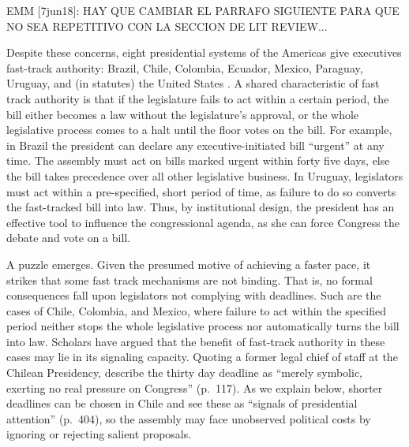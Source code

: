 \documentclass[letter,12pt]{article}
\begin{document}
EMM [7jun18]: HAY QUE CAMBIAR EL PARRAFO SIGUIENTE PARA QUE NO SEA REPETITIVO CON LA SECCION DE LIT REVIEW...

Despite these concerns, eight presidential systems of the Americas give executives fast-track authority: Brazil, Chile, Colombia, Ecuador, Mexico, Paraguay, Uruguay, and (in statutes) the United States \citep{morgenstern.2002b,garcia.montero.presidentes.2009}. A shared characteristic of fast track authority is that if the legislature fails to act within a certain period, the bill either becomes a law without the legislature's approval, or the whole legislative process comes to a halt until the floor votes on the bill. For example, in Brazil the president can declare any executive-initiated bill ``urgent'' at any time. The assembly must act on bills marked urgent within forty five days, else the bill takes precedence over all other legislative business. In Uruguay, legislators must act within a pre-specified, short period of time, as failure to do so converts the fast-tracked bill into law. Thus, by institutional design, the president has an effective tool to influence the congressional agenda, as she can force Congress the debate and vote on a bill.

A puzzle emerges. Given the presumed motive of achieving a faster pace, it strikes that some fast track mechanisms are not binding. That is, no formal consequences fall upon legislators not complying with deadlines. Such are the cases of Chile, Colombia, and Mexico, where failure to act within the specified period neither stops the whole legislative process nor automatically turns the bill into law. Scholars have argued that the benefit of fast-track authority in these cases may lie in its signaling capacity. Quoting a former legal chief of staff at the Chilean Presidency, \citet{berrios.gamboa.fiscChile.2006} describe the thirty day deadline as ``merely symbolic, exerting no real pressure on Congress'' (p.~117). As we explain below, shorter deadlines can be chosen in Chile and \citet{aleman.navia.UrgChi.2009} see these as ``signals of presidential attention'' (p.~404), so the assembly may face unobserved political costs by ignoring or rejecting salient proposals. 
\end{document}
